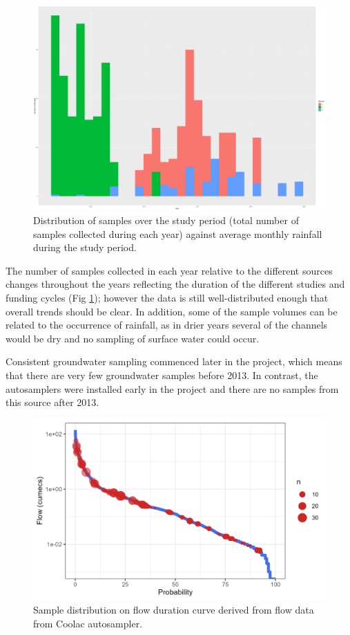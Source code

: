 \documentclass[, manuscript]{copernicus}
\begin{document}
\clearpage

\begin{figure}
\includegraphics[width=0.5\linewidth]{Figures/annual} \caption{Distribution of samples over the study period (total number of samples collected during each year) against average monthly rainfall during the study period. }\label{fig:annual-plot}
\end{figure}

The number of samples collected in each year relative to the different
sources changes throughout the years reflecting the duration of the
different studies and funding cycles (Fig \ref{fig:annual-plot});
however the data is still well-distributed enough that overall trends
should be clear. In addition, some of the sample volumes can be related
to the occurrence of rainfall, as in drier years several of the channels
would be dry and no sampling of surface water could occur.

Consistent groundwater sampling commenced later in the project, which
means that there are very few groundwater samples before 2013. In
contrast, the autosamplers were installed early in the project and there
are no samples from this source after 2013.

\clearpage

\begin{figure}
\includegraphics[width=0.8\linewidth]{Figures/FDC} \caption{Sample distribution on flow duration curve derived from flow data from Coolac autosampler.}\label{fig:FDC}
\end{figure}
\end{document}
